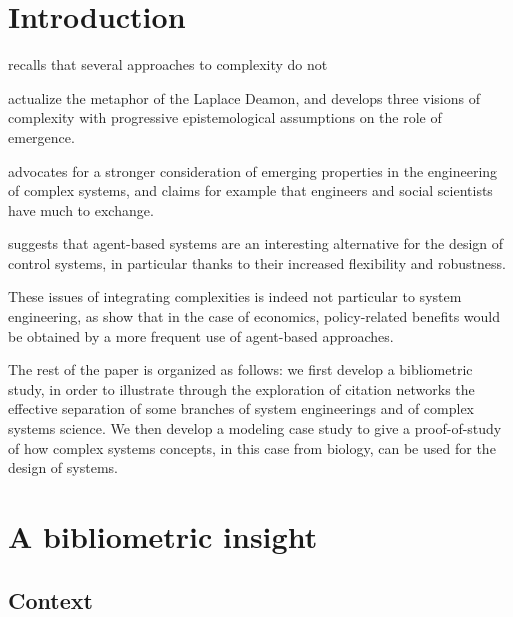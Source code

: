 \documentclass[runningheads,a4paper]{llncs2e/llncs}
\begin{document}
\section{Introduction}




\cite{chu2008criteria} recalls that several approaches to complexity do not

\cite{deffuant2015visions} actualize the metaphor of the Laplace Deamon, and develops three visions of complexity with progressive epistemological assumptions on the role of emergence.


\cite{ottino2004engineering} advocates for a stronger consideration of emerging properties in the engineering of complex systems, and claims for example that engineers and social scientists have much to exchange.


\cite{jennings2003agent} suggests that agent-based systems are an interesting alternative for the design of control systems, in particular thanks to their increased flexibility and robustness.

These issues of integrating complexities is indeed not particular to system engineering, as \cite{farmer2009economy} show that in the case of economics, policy-related benefits would be obtained by a more frequent use of agent-based approaches. 



The rest of the paper is organized as follows: we first develop a bibliometric study, in order to illustrate through the exploration of citation networks the effective separation of some branches of system engineerings and of complex systems science. We then develop a modeling case study to give a proof-of-study of how complex systems concepts, in this case from biology, can be used for the design of systems.



\section{A bibliometric insight}

\subsection{Context}
\end{document}
